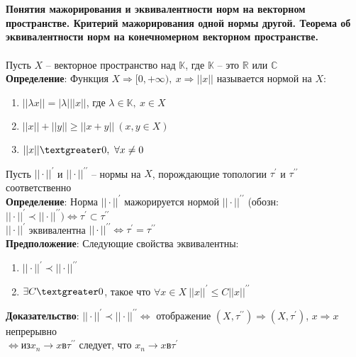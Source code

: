\section{}
	\textbf{Понятия мажорирования и эквивалентности норм на векторном пространстве. Критерий мажорирования одной нормы другой. Теорема об эквивалентности норм на конечномерном векторном пространстве.}\\
	\\
	Пусть $X$ -- векторное пространство над $\mathbb{K}$, где $\mathbb{K}$ -- это $\mathbb{R}$ или $\mathbb{C}$\\
	\textbf{Определение}: Функция $X \Rightarrow [0,+ \infty),\ x \Rightarrow ||x||$ называется нормой на $X$:
	\begin{enumerate}
		\item 
		$||\lambda x|| = |\lambda| ||x||$, где $\lambda \in \mathbb{K},\ x\in X$
		\item 
		$||x|| + ||y|| \geqslant ||x + y||\ (x,y \in X)$
		\item 
		$||x|| \textgreater 0,\ \forall x \neq 0$
	\end{enumerate}
	Пусть $||\cdot||^{\prime}$ и $||\cdot||^{\prime \prime}$ -- нормы на $X$, порождающие топологии $\tau^{\prime}$ и $\tau^{\prime \prime}$ соответственно\\
	\textbf{Определение}: Норма $||\cdot||^{\prime}$ мажорируется нормой $||\cdot||^{\prime \prime}$ (обозн: $||\cdot||^{\prime} \prec ||\cdot||^{\prime \prime}) \Leftrightarrow \tau^{\prime} \subset \tau^{\prime \prime}$\\
	$||\cdot||^{\prime}$ эквивалентна $||\cdot||^{\prime \prime} \Leftrightarrow \tau^{\prime}=\tau^{\prime \prime}$\\
	\textbf{Предположение}: Следующие свойства эквивалентны:
	\begin{enumerate}
		\item 
		$||\cdot||^{\prime} \prec ||\cdot||^{\prime \prime}$
		\item 
		$\exists C \textgreater 0$, такое что $\forall x\in X\ ||x||^{\prime} \leqslant C||x||^{\prime \prime}$
	\end{enumerate}
	\textbf{Доказательство}: $||\cdot||^{\prime} \prec ||\cdot||^{\prime \prime} \Leftrightarrow$ отображение $(X, \tau^{\prime \prime})\Rightarrow (X, \tau^{\prime})$, $x\Rightarrow x$ непрерывно\\
	$\Leftrightarrow из x_n \to x в \tau^{\prime \prime}$ следует, что $x_n \to x в \tau^{\prime}$\\
	\\
